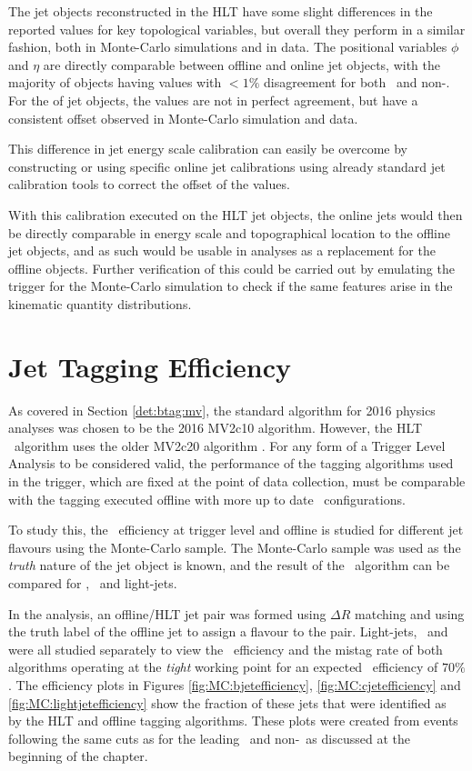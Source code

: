 		The jet objects reconstructed in the HLT have some slight differences in the reported values for key topological variables, but overall they perform in a similar fashion, both in Monte-Carlo simulations and in data. The positional variables $\phi$ and $\eta$ are directly comparable between offline and online jet objects, with the majority of objects having values with $<1\%$ disagreement for both \bjets\ and non-\bjets. For the \pt of jet objects, the values are not in perfect agreement, but have a consistent offset observed in Monte-Carlo simulation and data.

		This difference in jet energy scale calibration can easily be overcome by constructing  or using specific online jet calibrations using already standard jet calibration tools \cite{JES, jetcalib} to correct the offset of the \pt values.

		With this calibration executed on the HLT jet objects, the online jets would then be directly comparable in energy scale and topographical location to the offline jet objects, and as such would be usable in analyses as a replacement for the offline objects. Further verification of this could be carried out by emulating the trigger for the Monte-Carlo simulation to check if the same features arise in the kinematic quantity distributions.

\section{Jet Tagging Efficiency}

	As covered in Section  \ref{det:btag:mv}, the standard algorithm for 2016 physics analyses was chosen to be the 2016 MV2c10 algorithm. However, the HLT \btag\ algorithm uses the older MV2c20 algorithm \cite{trig2015}. For any form of a Trigger Level Analysis to be considered valid, the performance of the tagging algorithms used in the trigger, which are fixed at the point of data collection, must be comparable with the tagging executed offline with more up to date \btag\ configurations.

	\newpage
	To study this, the \btag\ efficiency at trigger level and offline is studied for different jet flavours using the Monte-Carlo sample. The Monte-Carlo sample was used as the \textit{truth} nature of the jet object is known, and the result of the \btag\ algorithm can be compared for \bjets, \cjets\, and light-jets.

	In the analysis, an offline/HLT jet pair was formed using $\Delta R$ matching and using the truth label of the offline jet to assign a flavour to the pair. Light-jets, \bjets\, and \cjets\, were all studied separately to view the \btag\, efficiency and the mistag rate of both algorithms operating at the \textit{tight} working point for an expected \btag\ efficiency of $70\%$. The efficiency plots in Figures \ref{fig:MC:bjetefficiency}, \ref{fig:MC:cjetefficiency} and \ref{fig:MC:lightjetefficiency} show the fraction of these jets that were identified as \bjets\, by the HLT and offline tagging algorithms. These plots were created from events following the same cuts as for the leading \bjet\ and non-\bjet\ as discussed at the beginning of the chapter.

